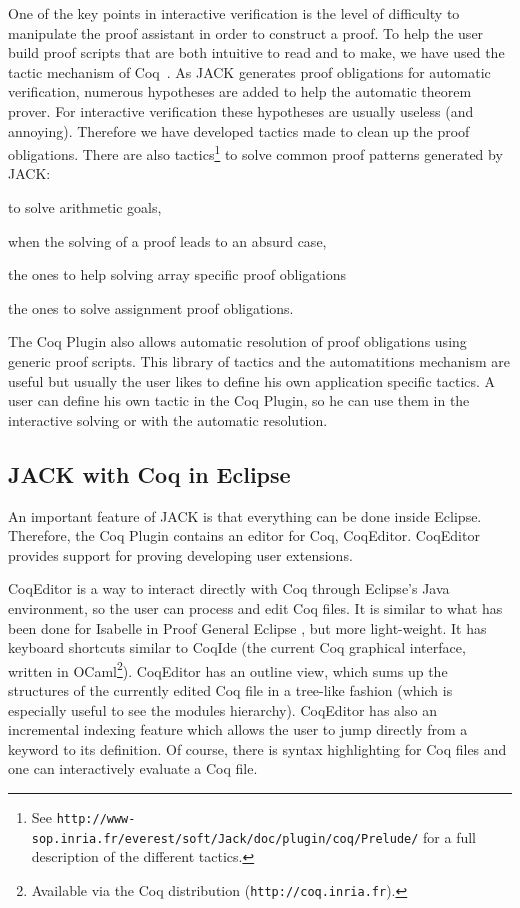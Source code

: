 One of the key points in interactive verification is the level of difficulty
to manipulate the proof assistant in order to construct a proof.
To help the user  build proof scripts that are both intuitive
to read and to make, we have used the tactic mechanism of Coq~\cite{DEL-00-LTAC}.
As JACK generates proof obligations for automatic verification, numerous hypotheses
 are 
added to help the automatic theorem prover. For interactive verification 
these hypotheses are usually useless (and annoying). 
Therefore we have developed tactics made to clean up the proof obligations. 
There are also tactics\footnote{
See \texttt{http://www-sop.inria.fr/everest/soft/Jack/doc/plugin/coq/Prelude/}
for a full description of the different tactics.}
 to solve common proof patterns
generated by JACK: \begin{inparaenum}
\item to solve arithmetic goals,
\item when the solving of a proof leads to an absurd case, 
\item the ones to help solving
array specific proof obligations 
\item the ones to solve assignment proof obligations.
\end{inparaenum}
 The Coq Plugin also allows automatic resolution of proof 
obligations using generic proof scripts.
This library of tactics and the automatitions mechanism are 
useful but usually the user likes to define his own application
specific tactics.
A user can define his own tactic in the Coq Plugin,
 so he can use them in the interactive solving or 
with the automatic resolution.








\subsection{JACK with Coq in Eclipse}
An important feature of JACK is that everything can be done inside Eclipse.
Therefore, the Coq Plugin contains an editor for Coq, CoqEditor. 
CoqEditor provides support for proving developing user extensions.

CoqEditor is a way to interact directly with Coq through Eclipse's Java 
environment, so the user can process and edit Coq files. 
It is similar to what has been done for Isabelle in 
Proof General Eclipse \cite{WintersteinAL05}, but more light-weight.
It has keyboard shortcuts similar to CoqIde (the current Coq graphical
interface, written in OCaml\footnote{Available via the
Coq distribution (\texttt{http://coq.inria.fr}).}). 
CoqEditor has an outline view,
which sums up the structures of the currently edited Coq file 
in a tree-like fashion (which is especially useful to see the modules hierarchy). 
CoqEditor has also an incremental indexing feature which allows the user
to jump directly from a keyword to its definition.
Of course, there is syntax highlighting for Coq files 
and one can interactively evaluate a Coq file.


